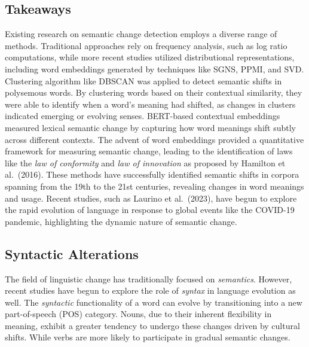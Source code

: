 \subsection{Takeaways}\label{subsec:semantic-takeaways}
Existing research on semantic change detection employs a diverse range of methods.
Traditional approaches rely on frequency analysis, such as log ratio computations\cite{gulordava-baroni-2011-distributional},
while more recent studies utilized distributional representations\cite{kim-etal-2014-temporal, kulkarni2014statisticallysignificantdetectionlinguistic, hamilton-etal-2016-cultural},
including word embeddings generated by techniques like SGNS, PPMI, and SVD\cite{hamilton-etal-2016-diachronic}.
Clustering algorithm like DBSCAN\cite{10.1007/978-3-319-50496-4_18} was applied to detect semantic shifts in polysemous words.
By clustering words based on their contextual similarity, they were able to identify when a word’s meaning had shifted, as changes in clusters indicated emerging or evolving senses.
BERT-based contextual embeddings\cite{giulianelli-etal-2020-analysing} measured lexical semantic change by capturing how word meanings shift subtly across different contexts.
The advent of word embeddings provided a quantitative framework for measuring semantic change,
leading to the identification of laws like the \emph{law of conformity} and \emph{law of innovation} as proposed by Hamilton et al.\ (2016).
These methods have successfully identified semantic shifts in corpora spanning from the 19th to the 21st centuries, revealing changes in word meanings and usage.
Recent studies, such as Laurino et al.\ (2023), have begun to explore the rapid evolution of language in response to global events like the COVID-19 pandemic,
highlighting the dynamic nature of semantic change.

\subsection{Syntactic Alterations} \label{subsec:syntactic-alterations}
The field of linguistic change has traditionally focused on \emph{semantics}.
However, recent studies have begun to explore the role of \emph{syntax} in language evolution as well.
The \emph{syntactic} functionality of a word can evolve by transitioning into a new part-of-speech (POS) category.
Nouns, due to their inherent flexibility in meaning, exhibit a greater tendency to undergo these changes driven by cultural shifts.
While verbs are more likely to participate in gradual semantic changes. \cite{hamilton-etal-2016-cultural, hamilton-etal-2016-diachronic}

